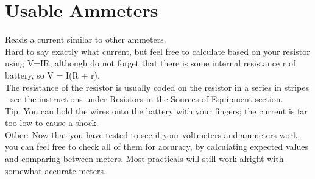 \section{Usable Ammeters}
Reads a current similar to other ammeters. \\
Hard to say exactly what current, 
but feel free to calculate based on your resistor using V=IR, although do not
forget that there is some internal resistance r of battery, so V = I(R + r). \\
The resistance of the resistor is usually coded on the resistor in a series in stripes -
see the instructions under Resistors in the Sources of Equipment section.  \\
Tip: You can hold the wires onto the battery with your fingers; the current
is far too low to cause a shock.  \\
Other: Now that you have tested to see if your voltmeters and ammeters
work, you can feel free to check all of them for accuracy, by calculating expected
values and comparing between meters. Most practicals will still work alright
with somewhat accurate meters.

